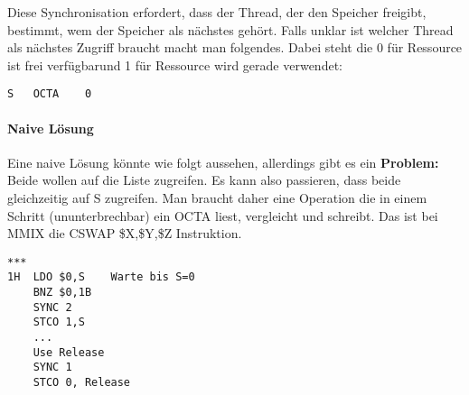 Diese Synchronisation erfordert, dass der Thread, der den Speicher freigibt, bestimmt, wem der Speicher als nächstes gehört. Falls unklar ist welcher Thread als nächstes Zugriff braucht macht man folgendes. Dabei steht die 0 für \glqq Ressource ist frei verfügbar\grqq und 1 für \glqq Ressource wird gerade verwendet\grqq:

\begin{lstlisting}
S	OCTA	0
\end{lstlisting}

\paragraph{Naive Lösung} Eine naive Lösung könnte wie folgt aussehen, allerdings gibt es ein \textbf{Problem:} Beide wollen auf die Liste zugreifen. Es kann also passieren, dass beide gleichzeitig auf S zugreifen. Man braucht daher eine Operation die in einem Schritt (ununterbrechbar) ein OCTA liest, vergleicht und schreibt. Das ist bei MMIX die CSWAP \$X,\$Y,\$Z Instruktion. 

\begin{lstlisting}
***
1H	LDO	$0,S	Warte bis S=0
	BNZ $0,1B
	SYNC 2
	STCO 1,S
	... 
	Use Release
	SYNC 1
	STCO 0,	Release
\end{lstlisting}
